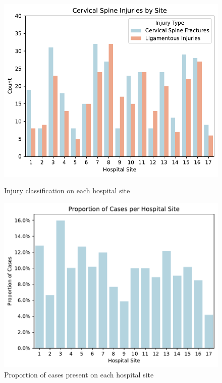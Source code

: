 \documentclass[10pt,letterpaper]{article}
\begin{document}
\begin{figure}[H]
    \centering
    \begin{minipage}{0.45\textwidth}
        \centering
        \includegraphics[width=\linewidth]{plots/cervical_spine_injuries_by_site.pdf}
        \caption{Injury classification on each hospital site}
        \label{fig:injury-site}
    \end{minipage}\hfill
    \begin{minipage}{0.45\textwidth}
        \centering
        \includegraphics[width=\linewidth]{plots/cases_per_site.pdf}
        \caption{Proportion of cases present on each hospital site}
        \label{fig:cases-site}
    \end{minipage}
\end{figure}
\end{document}

